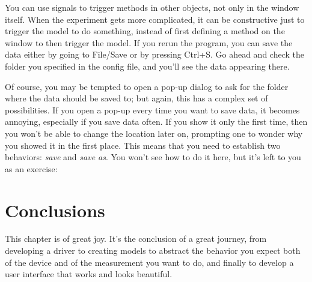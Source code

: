 
You can use signals to trigger methods in other objects, not only in the window itself. When the experiment gets more complicated, it can be constructive just to trigger the model to do something, instead of first defining a method on the window to then trigger the model. If you rerun the program, you can save the data either by going to File/Save or by pressing Ctrl+S. Go ahead and check the folder you specified in the config file, and you'll see the data appearing there.


Of course, you may be tempted to open a pop-up dialog to ask for the folder where the data should be saved to; but again, this has a complex set of possibilities. If you open a pop-up every time you want to save data, it becomes annoying, especially if you save data often. If you show it only the first time, then you won't be able to change the location later on, prompting one to wonder why you showed it in the first place. This means that you need to establish two behaviors: \emph{save} and \emph{save as}. You won't see how to do it here, but it's left to you as an exercise:


\section{Conclusions}\label{sec:conclusions}
This chapter is of great joy. It's the conclusion of a great journey, from developing a driver to creating models to abstract the behavior you expect both of the device and of the measurement you want to do, and finally to develop a user interface that works and looks beautiful.

